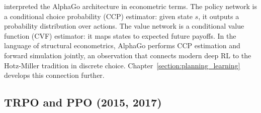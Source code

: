 \citet{Igami2020} interpreted the AlphaGo architecture in econometric terms. The policy network is a conditional choice probability (CCP) estimator: given state $s$, it outputs a probability distribution over actions. The value network is a conditional value function (CVF) estimator: it maps states to expected future payoffs. In the language of structural econometrics, AlphaGo performs CCP estimation and forward simulation jointly, an observation that connects modern deep RL to the Hotz-Miller tradition in discrete choice. Chapter~\ref{section:planning_learning} develops this connection further.

\subsection{TRPO and PPO (2015, 2017)}

